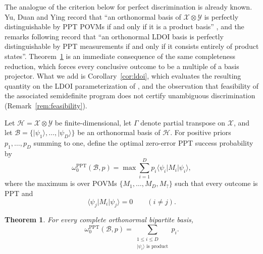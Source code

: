 \documentclass[11pt]{amsart}
\newtheorem{theorem}{Theorem}
\theoremstyle{remark}
\newcommand{\ket}[1]{\lvert #1\rangle}
\newcommand{\bra}[1]{\langle #1\rvert}
\begin{document}
The analogue of the criterion below for perfect discrimination is already
known. Yu, Duan and Ying record that ``an orthonormal basis of
$\mathcal X\otimes\mathcal Y$ is perfectly distinguishable by PPT POVMs if and
only if it is a product basis'' \cite[Sec.~II]{YuDuanYing}, and the remarks
following \cite[Theorem~10]{JohnstonRusso} record that ``an orthonormal LDOI
basis is perfectly distinguishable by PPT measurements if and only if it
consists entirely of product states''. Theorem~\ref{thm:exact} is an immediate
consequence of the same completeness reduction, which forces every conclusive
outcome to be a multiple of a basis projector. What we add is
Corollary~\ref{cor:ldoi}, which evaluates the resulting quantity on the LDOI
parameterization of \cite[Definition~6]{JohnstonRusso}, and the observation
that feasibility of the associated semidefinite program does not certify
unambiguous discrimination (Remark~\ref{rem:feasibility}).

Let $\mathcal H=\mathcal X\otimes\mathcal Y$ be finite-dimensional, let
$\Gamma$ denote partial transpose on $\mathcal X$, and let
$\mathcal B=\{\ket{\psi_1},\ldots,\ket{\psi_D}\}$ be an orthonormal basis of
$\mathcal H$. For positive priors $p_1,\ldots,p_D$ summing to one, define the
optimal zero-error PPT success probability by
\begin{equation}\label{eq:omega}
\omega^{\mathrm{PPT}}_0(\mathcal B,p)
=
\max \sum_{i=1}^D p_i\bra{\psi_i}M_i\ket{\psi_i},
\end{equation}
where the maximum is over POVMs
$\{M_1,\ldots,M_D,M_{?}\}$ such that every outcome is PPT and
\[
  \bra{\psi_j}M_i\ket{\psi_j}=0
  \qquad (i\neq j).
\]

\begin{theorem}\label{thm:exact}
For every complete orthonormal bipartite basis,
\[
  \omega^{\mathrm{PPT}}_0(\mathcal B,p)
  =
  \sum_{\substack{1\leq i\leq D\\ \ket{\psi_i}\text{ is product}}}p_i.
\]
\end{theorem}
\end{document}
